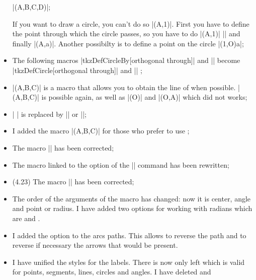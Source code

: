 \begin{itemize}
 |\tkzDrawPolygon(A,B,C,D)|;

If you want to draw a circle, you can't do so |\tkzDrawCircle[R](A,1)|. First you have to define the point through which the circle passes, so you have to do 
|\tkzDefCircle[R](A,1)| || and finally |\tkzDrawCircle(A,a)|. Another possibilty is to define a point on the circle |\tkzDefShiftPoint[A](1,O){a}|;


\item The following macros  |tkzDefCircleBy[orthogonal through]| and || become |tkzDefCircle[orthogonal through]| and || ;


\item |\tkzDefLine[euler](A,B,C)| is a macro that allows you to obtain the line of  when possible. |\tkzDefLine[altitude](A,B,C)| is possible again, as well as |\tkzDefLine[tangent at=A](O)| and |\tkzDefLine[tangent from=P](O,A)| which did not works;


\item | \tkzDefTangent| is replaced by |\tkzDefLine[tangent from = ...]| or |\tkzDefLine[tangent at = ...]|;


\item I added the macro |(A,B,C)| for those who prefer to use  \TIKZ ;


\item The macro |\tkzMarkAngle| has been corrected;

\item The macro linked to the  option of the |\tkzDefCircle| command has been rewritten;

\item (4.23) The macro |\tkzDrawSemiCircle| has been corrected;

\item 
The order of the arguments of the macro  has changed: now it is center, angle and point or radius.
I have added two options for working with radians which are  and .


\item I added the option  to the arcs paths. This allows to reverse the path and to reverse if necessary the arrows that would be present.


\item I have unified the styles for the labels. There is now only  left which is valid for points, segments, lines, circles and angles. I have deleted   and 


\end{itemize}
